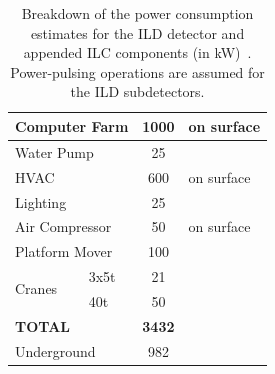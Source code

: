 \begin{table}[htb]
\begin{tabular}{l|l|c|c|c|c}
        \multicolumn{2}{l|}{Computer Farm}& 1000 & \multicolumn{3}{l}{on surface}\\ \hline
        \multicolumn{2}{l|}{Water Pump}& 25 & \multicolumn{3}{l}{}\\ \hline
        \multicolumn{2}{l|}{HVAC}& 600 & \multicolumn{3}{l}{on surface}\\ \hline
        \multicolumn{2}{l|}{Lighting}& 25 & \multicolumn{3}{l}{}\\ \hline
        \multicolumn{2}{l|}{Air Compressor}& 50 & \multicolumn{3}{l}{on surface}\\ \hline
        \multicolumn{2}{l|}{Platform Mover}& 100 & \multicolumn{3}{l}{}\\ \hline
        \multirow{2}{*}{Cranes} & 3x5t & 21 & \multicolumn{3}{l}{}\\
        & 40t & 50 & \multicolumn{3}{l}{}\\ \hline
        \multicolumn{2}{l|}{{\bf TOTAL}}& {\bf 3432} & \multicolumn{3}{l}{}\\ \hline
        \multicolumn{2}{l|}{Underground}& 982 & \multicolumn{3}{l}{}\\ \hline
    \end{tabular}
    \caption{Breakdown of the power consumption estimates for the ILD detector and appended ILC components (in kW)~\cite{ild:bib:services}. Power-pulsing operations are assumed for the ILD subdetectors.}
    \label{tab:integration:power}
\end{table}

